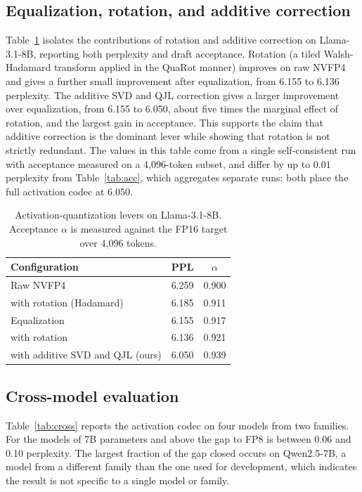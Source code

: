 \documentclass[11pt]{article}
\begin{document}
\subsection{Equalization, rotation, and additive correction}
Table~\ref{tab:levers} isolates the contributions of rotation and additive correction
on Llama-3.1-8B, reporting both perplexity and draft acceptance. Rotation (a tiled
Walsh-Hadamard transform applied in the QuaRot manner) improves on raw NVFP4 and gives a
further small improvement after equalization, from 6.155 to 6.136 perplexity. The
additive SVD and QJL correction gives a larger improvement over equalization, from 6.155
to 6.050, about five times the marginal effect of rotation, and the largest gain in
acceptance. This supports the claim that additive correction is the dominant lever while
showing that rotation is not strictly redundant. The values in this table come from a
single self-consistent run with acceptance measured on a 4{,}096-token subset, and
differ by up to $0.01$ perplexity from Table~\ref{tab:acc}, which aggregates separate
runs; both place the full activation codec at $6.050$.

\begin{table}[h]\centering\small
\caption{Activation-quantization levers on Llama-3.1-8B. Acceptance $\alpha$ is measured
against the FP16 target over 4{,}096 tokens.}\label{tab:levers}
\begin{tabular}{lcc}
\toprule
Configuration & PPL & $\alpha$ \\
\midrule
Raw NVFP4 & 6.259 & 0.900 \\
\;with rotation (Hadamard) & 6.185 & 0.911 \\
Equalization & 6.155 & 0.917 \\
\;with rotation & 6.136 & 0.921 \\
\;with additive SVD and QJL (ours) & 6.050 & 0.939 \\
\bottomrule
\end{tabular}
\end{table}

\subsection{Cross-model evaluation}
Table~\ref{tab:cross} reports the activation codec on four models from two families.
For the models of 7B parameters and above the gap to FP8 is between 0.06 and 0.10
perplexity. The largest fraction of the gap closed occurs on Qwen2.5-7B, a model from a
different family than the one used for development, which indicates the result is not
specific to a single model or family.
\end{document}
